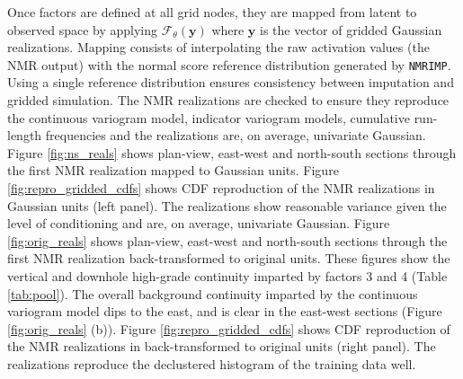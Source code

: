 Once factors are defined at all grid nodes, they are mapped from latent to observed space by applying $\mathcal{F}_{\theta}(\mathbf{y})$ where $\mathbf{y}$ is the vector of gridded Gaussian realizations. Mapping consists of interpolating the raw activation values (the \gls{NMR} output) with the normal score reference distribution generated by \texttt{NMRIMP}. Using a single reference distribution ensures consistency between imputation and gridded simulation. The \gls{NMR} realizations are checked to ensure they reproduce the continuous variogram model, indicator variogram models, cumulative run-length frequencies and the realizations are, on average, univariate Gaussian. Figure \ref{fig:ns_reals} shows plan-view, east-west and north-south sections through the first \gls{NMR} realization mapped to Gaussian units. Figure \ref{fig:repro_gridded_cdfs} shows \gls{CDF} reproduction of the \gls{NMR} realizations in Gaussian units (left panel). The realizations show reasonable variance given the level of conditioning and are, on average, univariate Gaussian. Figure \ref{fig:orig_reals} shows plan-view, east-west and north-south sections through the first \gls{NMR} realization back-transformed to original units. These figures show the vertical and downhole high-grade continuity imparted by factors 3 and 4 (Table \ref{tab:pool}). The overall background continuity  imparted by the continuous variogram model dips to the east, and is clear in the east-west sections (Figure \ref{fig:orig_reals} (b)). Figure \ref{fig:repro_gridded_cdfs} shows \gls{CDF} reproduction of the \gls{NMR} realizations in back-transformed to original units (right panel). The realizations reproduce the declustered histogram of the training data well.


